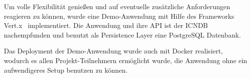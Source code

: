 Um volle Flexibilit\"at genie\ss{}en und auf eventuelle zus\"atzliche Anforderungen reagieren zu k\"onnen, wurde eine Demo-Anwendung mit Hilfe des Frameworks Vert.x~\cite{Vertx:online} implementiert.
Die Anwendung und ihre API ist der ICNDB~\cite{ICNDB:online} nachempfunden und benutzt als Persistence Layer eine PostgreSQL Datenbank.

Das Deployment der Demo-Anwendung wurde auch mit Docker realisiert, wodurch es allen Projekt-Teilnehmern erm\"oglicht wurde, die Anwendung ohne ein aufwendigeres Setup benutzen zu k\"onnen.
